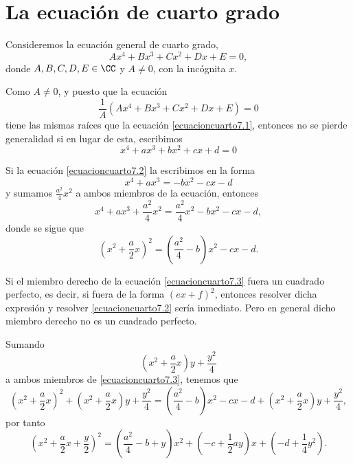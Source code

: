 \section{La ecuación de cuarto grado}

Consideremos la ecuación general de cuarto grado,
\begin{equation}
    Ax^4+Bx^3+Cx^2+Dx+E=0, \label{ecuacioncuarto7.1}
\end{equation}
donde $A,  B,  C,  D,  E \in \CC$ y $A \neq 0$, con la incógnita $x$.

Como $A \neq 0$, y puesto que la ecuación
$$\frac{1}{A} \left( Ax^4+Bx^3+Cx^2+Dx+E \right) =0$$
tiene las mismas raíces que la ecuación \eqref{ecuacioncuarto7.1}, entonces no se pierde generalidad si en lugar de esta, escribimos
\begin{equation}
    x^4+ax^3+bx^2+cx+d=0 \label{ecuacioncuarto7.2}
\end{equation}

Si la ecuación \eqref{ecuacioncuarto7.2} la escribimos en la forma
$$x^4+ax^3=-bx^2-cx-d$$
y sumamos $\displaystyle \frac{a^2}{4}x^2$ a ambos miembros de la ecuación, entonces
$$x^4+ax^3+\frac{a^2}{4}x^2=\frac{a^2}{4}x^2-bx^2-cx-d,$$
donde se sigue que
\begin{equation}
    \left( x^2+\frac{a}{2}x \right)^2 = \left( \frac{a^2}{4}-b \right) x^2-cx-d. \label{ecuacioncuarto7.3}
\end{equation}

Si el miembro derecho de la ecuación \eqref{ecuacioncuarto7.3} fuera un cuadrado perfecto, es decir, si fuera de la forma $(ex+f)^2$, entonces resolver dicha expresión y resolver \eqref{ecuacioncuarto7.2} sería inmediato. Pero en general dicho miembro derecho no es un cuadrado perfecto.

Sumando
$$\left( x^2+\frac{a}{2}x \right) y + \frac{y^2}{4}$$
a ambos miembros de \eqref{ecuacioncuarto7.3}, tenemos que
$$\left( x^2+\frac{a}{2}x \right)^2 + \left( x^2+\frac{a}{2}x \right) y + \frac{y^2}{4} = \left( \frac{a^2}{4}-b \right) x^2-cx-d + \left( x^2+\frac{a}{2}x \right) y + \frac{y^2}{4},$$
por tanto
\begin{equation}
    \left( x^2+\frac{a}{2}x+\frac{y}{2} \right)^2 = \left( \frac{a^2}{4}-b+y \right) x^2 + \left( -c+\frac{1}{2} ay \right) x+ \left( -d + \frac{1}{4} y^2 \right). \label{ecuacioncuarto7.4}
\end{equation}

\newpage

